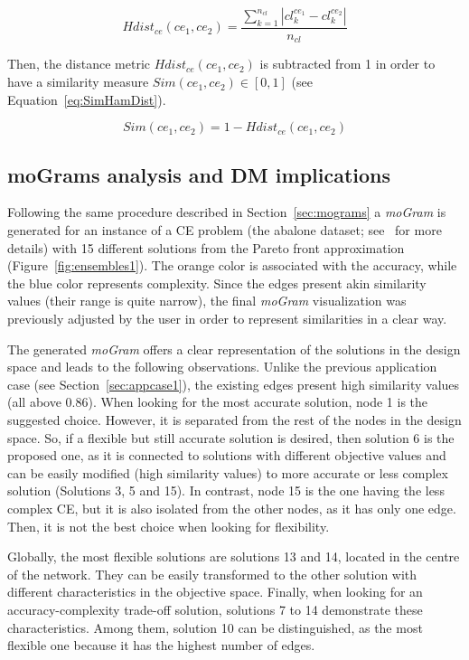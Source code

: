 \documentclass[journal]{IEEEtran}
\begin{document}
\begin{equation}
\label{eq:HamDist}
Hdist_{ce}(ce_1,ce_2) = \frac{\sum_{k=1}^{n_{cl}} |cl_{k}^{ce_1} - cl_{k}^{ce_2}| }{n_{cl}}
\end{equation}

Then, the distance metric $Hdist_{ce}(ce_1,ce_2)$ is subtracted from 1 in order to have a similarity measure $Sim(ce_1,ce_2) \in [0,1]$ (see Equation~\ref{eq:SimHamDist}). 

\begin{equation}
\label{eq:SimHamDist}
 Sim(ce_1,ce_2) = 1 - Hdist_{ce}(ce_1,ce_2)
\end{equation}


\subsection{moGrams analysis and DM implications}


Following the same procedure described in Section~\ref{sec:mograms} a \emph{moGram} is generated for an instance of a CE problem (the abalone dataset; see~\cite{Trawinski11} for more details) with 15 different solutions from the Pareto front approximation (Figure~\ref{fig:ensembles1}). The orange color is associated with the accuracy, while the blue color represents complexity. Since the edges present akin similarity values (their range is quite narrow), the final \emph{moGram} visualization was previously adjusted by the user in order to represent similarities in a clear way. 

The generated \emph{moGram} offers a clear representation of the solutions in the design space and leads to the following observations. Unlike the previous application case (see Section~\ref{sec:appcase1}), the existing edges present high similarity values (all above 0.86).  
When looking for the most accurate solution, node 1 is the suggested choice. However, it is separated from the rest of the nodes in the design space. So, if a flexible but still accurate solution is desired, then solution 6 is the proposed one, as it is connected to solutions with different objective values and can be easily modified (high similarity values) to more accurate or less complex solution (Solutions 3, 5 and 15).
In contrast, node 15 is the one having the less complex CE, but it is also isolated from the other nodes, as it has only one edge. Then, it is not the best choice when looking for flexibility.

Globally, the most flexible solutions are solutions 13 and 14, located in the centre of the network. They can be easily transformed to the other solution with different characteristics in the objective space. 
Finally, when looking for an accuracy-complexity trade-off solution, solutions 7 to 14 demonstrate these characteristics. Among them, solution 10 can be distinguished, as the most flexible one because it has the highest number of edges. 
\end{document}
